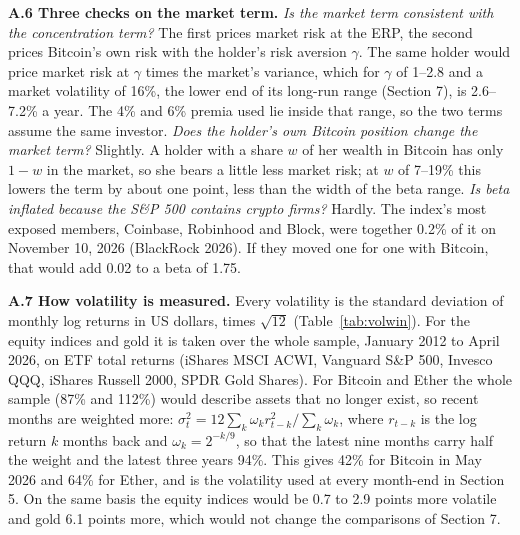 \documentclass[11pt]{article}
\begin{document}
\textbf{A.6 Three checks on the market term.} \emph{Is the market term consistent with the concentration term?} The first prices market risk at the ERP, the second prices Bitcoin's own risk with the holder's risk aversion $\gamma$. The same holder would price market risk at $\gamma$ times the market's variance, which for $\gamma$ of 1--2.8 and a market volatility of 16\%, the lower end of its long-run range (Section 7), is 2.6--7.2\% a year. The 4\% and 6\% premia used lie inside that range, so the two terms assume the same investor. \emph{Does the holder's own Bitcoin position change the market term?} Slightly. A holder with a share $w$ of her wealth in Bitcoin has only $1-w$ in the market, so she bears a little less market risk; at $w$ of 7--19\% this lowers the term by about one point, less than the width of the beta range. \emph{Is beta inflated because the S\&P 500 contains crypto firms?} Hardly. The index's most exposed members, Coinbase, Robinhood and Block, were together 0.2\% of it on November 10, 2026 (BlackRock 2026). If they moved one for one with Bitcoin, that would add 0.02 to a beta of 1.75.

\textbf{A.7 How volatility is measured.} Every volatility is the standard deviation of monthly log returns in US dollars, times $\sqrt{12}$ (Table~\ref{tab:volwin}). For the equity indices and gold it is taken over the whole sample, January 2012 to April 2026, on ETF total returns (iShares MSCI ACWI, Vanguard S\&P 500, Invesco QQQ, iShares Russell 2000, SPDR Gold Shares). For Bitcoin and Ether the whole sample (87\% and 112\%) would describe assets that no longer exist, so recent months are weighted more: $\sigma_t^2 = 12\sum_k \omega_k r_{t-k}^2 / \sum_k \omega_k$, where $r_{t-k}$ is the log return $k$ months back and $\omega_k = 2^{-k/9}$, so that the latest nine months carry half the weight and the latest three years 94\%. This gives 42\% for Bitcoin in May 2026 and 64\% for Ether, and is the volatility used at every month-end in Section 5. On the same basis the equity indices would be 0.7 to 2.9 points more volatile and gold 6.1 points more, which would not change the comparisons of Section 7.
\end{document}
